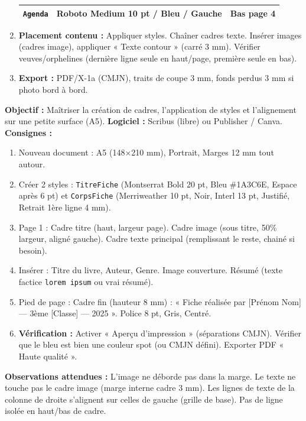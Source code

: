 \documentclass[11pt]{article}
\begin{document}
\begin{exoresolu}
\begin{enumerate}
\begin{center}
\begin{tabularx}{\linewidth}{|l|X|X|}
    \texttt{Agenda} & Roboto Medium 10 pt / Bleu / Gauche & Bas page 4 \\\hline
    \end{tabularx}
    \end{center}
    \item \textbf{Placement contenu :} Appliquer styles. Chaîner cadres texte. Insérer images (cadres image), appliquer « Texte contour » (carré 3 mm). Vérifier veuves/orphelines (dernière ligne seule en haut/page, première seule en bas).
    \item \textbf{Export :} PDF/X-1a (CMJN), traits de coupe 3 mm, fonds perdus 3 mm si photo bord à bord.
\end{enumerate}
\end{exoresolu}

\begin{experience}
\textbf{Objectif :} Maîtriser la création de cadres, l'application de styles et l'alignement sur une petite surface (A5).
\textbf{Logiciel :} Scribus (libre) ou Publisher / Canva.
\textbf{Consignes :}
\begin{enumerate}
    \item Nouveau document : A5 (148×210 mm), Portrait, Marges 12 mm tout autour.
    \item Créer 2 styles : \texttt{TitreFiche} (Montserrat Bold 20 pt, Bleu \#1A3C6E, Espace après 6 pt) et \texttt{CorpsFiche} (Merriweather 10 pt, Noir, Interl 13 pt, Justifié, Retrait 1ère ligne 4 mm).
    \item Page 1 : Cadre titre (haut, largeur page). Cadre image (sous titre, 50\% largeur, aligné gauche). Cadre texte principal (remplissant le reste, chainé si besoin).
    \item Insérer : Titre du livre, Auteur, Genre. Image couverture. Résumé (texte factice \texttt{lorem ipsum} ou vrai résumé).
    \item Pied de page : Cadre fin (hauteur 8 mm) : « Fiche réalisée par [Prénom Nom] — 3ème [Classe] — 2025 ». Police 8 pt, Gris, Centré.
    \item \textbf{Vérification :} Activer « Aperçu d'impression » (séparations CMJN). Vérifier que le bleu est bien une couleur spot (ou CMJN défini). Exporter PDF « Haute qualité ».
\end{enumerate}
\textbf{Observations attendues :} L'image ne déborde pas dans la marge. Le texte ne touche pas le cadre image (marge interne cadre 3 mm). Les lignes de texte de la colonne de droite s'alignent sur celles de gauche (grille de base). Pas de ligne isolée en haut/bas de cadre.
\end{experience}
\end{document}
